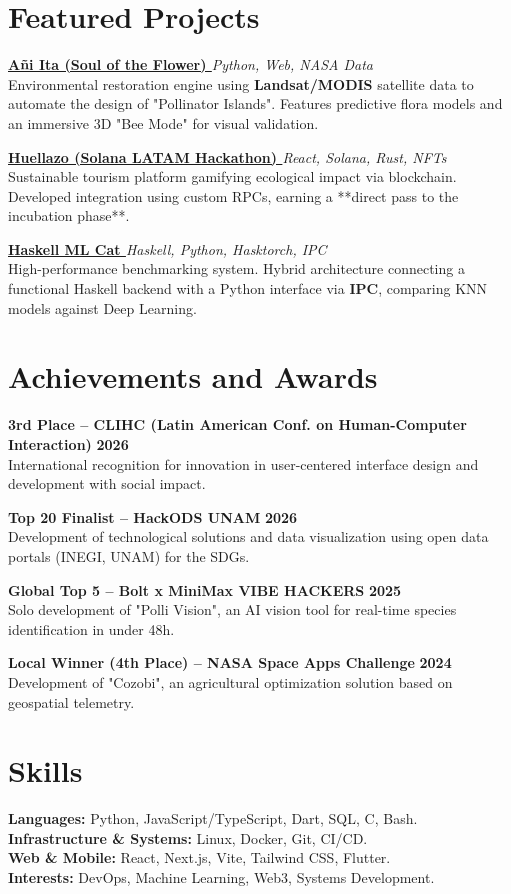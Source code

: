 \documentclass[a4paper,11pt]{article}
\newcommand{\project}[3]{
  \vspace{2pt}
  {\bfseries #1} \hfill \textit{\footnotesize #2} \\
  {\small #3} \par
  \vspace{3pt}
}
\newcommand{\award}[3]{
  \vspace{2pt}
  {\bfseries #1} \hfill \textbf{\footnotesize #2} \\
  {\small #3} \par
  \vspace{2pt}
}
\begin{document}
\section*{Featured Projects}

\project{\href{https://github.com/p3p3p3k4z/aniita-web}{Añi Ita (Soul of the Flower) \faGithub}}{Python, Web, NASA Data}{
Environmental restoration engine using \textbf{Landsat/MODIS} satellite data to automate the design of "Pollinator Islands". Features predictive flora models and an immersive 3D "Bee Mode" for visual validation.}

\project{\href{https://github.com/p3p3p3k4z/huellazo-solana}{Huellazo (Solana LATAM Hackathon) \faGithub}}{React, Solana, Rust, NFTs}{
Sustainable tourism platform gamifying ecological impact via blockchain. Developed integration using custom RPCs, earning a **direct pass to the incubation phase**.}

\project{\href{https://github.com/p3p3p3k4z/Haskell-ML-Cat}{Haskell ML Cat \faGithub}}{Haskell, Python, Hasktorch, IPC}{
High-performance benchmarking system. Hybrid architecture connecting a functional Haskell backend with a Python interface via \textbf{IPC}, comparing KNN models against Deep Learning.}

\section*{Achievements and Awards}

\award{3rd Place -- CLIHC (Latin American Conf. on Human-Computer Interaction)}{2026}{
International recognition for innovation in user-centered interface design and development with social impact.}

\award{Top 20 Finalist -- HackODS UNAM}{2026}{
Development of technological solutions and data visualization using open data portals (INEGI, UNAM) for the SDGs.}

\award{Global Top 5 -- Bolt x MiniMax VIBE HACKERS}{2025}{
Solo development of "Polli Vision", an AI vision tool for real-time species identification in under 48h.}

\award{Local Winner (4th Place) -- NASA Space Apps Challenge}{2024}{
Development of "Cozobi", an agricultural optimization solution based on geospatial telemetry.}

\section*{Skills}
\small
\textbf{Languages:} Python, JavaScript/TypeScript, Dart, SQL, C, Bash. \\
\textbf{Infrastructure \& Systems:} Linux, Docker, Git, CI/CD. \\
\textbf{Web \& Mobile:} React, Next.js, Vite, Tailwind CSS, Flutter. \\
\textbf{Interests:} DevOps, Machine Learning, Web3, Systems Development.
\end{document}
